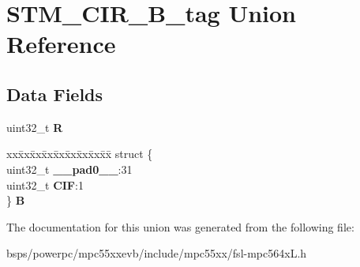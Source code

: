 \hypertarget{unionSTM__CIR__32B__tag}{}\section{S\+T\+M\+\_\+\+C\+I\+R\+\_\+B\+\_\+tag Union Reference}
\label{unionSTM__CIR__32B__tag}
\subsection*{Data Fields}
\begin{DoxyCompactItemize}
\item 
\mbox{\label{unionSTM__CIR__32B__tag_ae8094bd7da6c529815b14a4d50033639}} 
uint32\+\_\+t {\bfseries R}
\item 
\mbox{\label{unionSTM__CIR__32B__tag_a09456c241b17242d8f7fde9b868166ba}} 
\begin{tabbing}
xx\=xx\=xx\=xx\=xx\=xx\=xx\=xx\=xx\=\kill
struct \{\\
\>uint32\_t {\bfseries \_\_pad0\_\_}:31\\
\>uint32\_t {\bfseries CIF}:1\\
\} {\bfseries B}\\

\end{tabbing}\end{DoxyCompactItemize}


The documentation for this union was generated from the following file\+:\begin{DoxyCompactItemize}
\item 
bsps/powerpc/mpc55xxevb/include/mpc55xx/fsl-\/mpc564x\+L.\+h\end{DoxyCompactItemize}
